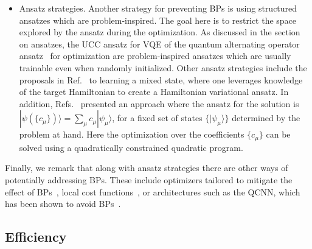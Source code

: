 \documentclass[prx,twocolumn,floatfix,superscriptaddress,longbibliography]{revtex4-1}
\newcommand{\<}{\langle}
\renewcommand{\>}{\rangle}
\newcommand{\ket}[1]{|#1\rangle}               %
\begin{document}
\begin{itemize}
    
\item{Ansatz strategies.}  Another strategy for preventing BPs is using structured ansatzes which are problem-inspired. The goal here is to restrict the space explored by the ansatz during the optimization.   As discussed in the section on ansatzes, the UCC ansatz for VQE of the quantum alternating operator ansatz~\cite{qaoa2014,nasaQAOA2019} for optimization are problem-inspired ansatzes which are usually trainable even when randomly initialized. Other ansatz strategies include the proposals in Ref.~\cite{verdon2019learning} to learning a mixed state, where one leverages knowledge of the target Hamiltonian to create a Hamiltonian variational ansatz. In addition, Refs.~\cite{bharti2020iterative,bharti2020quantum} presented an approach where the ansatz for the solution is $\ket{\psi\left(\{c_\mu\}\right)} = \sum_\mu c_\mu \ket{\psi_\mu}$, for a fixed set of states $\{\ket{\psi_\mu}\}$ determined by the problem at hand. Here the optimization over the coefficients $\{c_\mu\}$ can be solved using a  quadratically constrained quadratic program. 
\end{itemize}
Finally, we remark that along with ansatz strategies there are other ways of potentially addressing BPs. These include optimizers tailored to mitigate the effect of BPs~\cite{anand2020natural}, local cost functions~\cite{cerezo2020variational}, or architectures such as the QCNN, which has been shown to avoid BPs~\cite{pesah2020absence}.



\subsection{ Efficiency}\label{sec:Efficiency}
\end{document}
